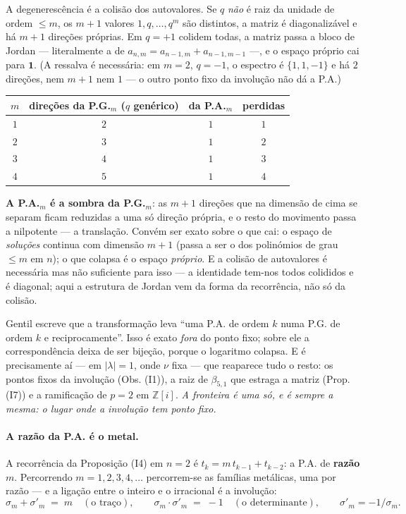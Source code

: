 \documentclass[11pt,a4paper]{article}
\theoremstyle{plain}
\theoremstyle{definition}
\theoremstyle{remark}
\newcommand{\Z}{\mathbb{Z}}
\begin{document}
\noindent A degenerescência é a colisão dos autovalores. Se $q$ \emph{não} é raiz da unidade de
ordem $\leq m$, os $m+1$ valores $1,q,\dots,q^m$ são distintos, a matriz é diagonalizável e há
$m+1$ direções próprias. Em $q=+1$ colidem todas, a matriz passa a bloco de Jordan --- literalmente
a de $a_{n,m}=a_{n-1,m}+a_{n-1,m-1}$ ---, e o espaço próprio cai para $\mathbf 1$. (A ressalva é
necessária: em $m=2$, $q=-1$, o espectro é $\{1,1,-1\}$ e há $2$ direções, nem $m+1$ nem $1$ --- o
outro ponto fixo da involução não dá a P.A.)

\begin{center}\small
\begin{tabular}{cccc}
\hline
$m$ & direções da P.G.$_m$ ($q$ genérico) & da P.A.$_m$ & perdidas \\ \hline
$1$ & $2$ & $1$ & $1$ \\
$2$ & $3$ & $1$ & $2$ \\
$3$ & $4$ & $1$ & $3$ \\
$4$ & $5$ & $1$ & $4$ \\
\hline
\end{tabular}
\end{center}

\noindent \textbf{A P.A.$_m$ é a sombra da P.G.$_m$}: as $m+1$ direções que na dimensão de cima se
separam ficam reduzidas a uma só direção própria, e o resto do movimento passa a nilpotente --- a
translação. Convém ser exato sobre o que cai: o espaço de \emph{soluções} continua com dimensão
$m+1$ (passa a ser o dos polinómios de grau $\leq m$ em $n$); o que colapsa é o espaço
\emph{próprio}. E a colisão de autovalores é necessária mas não suficiente para isso --- a
identidade tem-nos todos colididos e é diagonal; aqui a estrutura de Jordan vem da forma da
recorrência, não só da colisão.

Gentil escreve que a transformação leva ``uma P.A. de ordem $k$ numa P.G. de ordem $k$ e
reciprocamente''. Isso é exato \emph{fora} do ponto fixo; sobre ele a correspondência deixa de ser
bijeção, porque o logaritmo colapsa. E é precisamente aí --- em $|\lambda|=1$, onde $\nu$ fixa ---
que reaparece tudo o resto: os pontos fixos da involução (Obs. (I1)), a raiz de
$\beta_{5,1}$ que estraga a matriz (Prop. (I7)) e a ramificação de $p=2$ em $\Z[i]$.
\emph{A fronteira é uma só, e é sempre a mesma: o lugar onde a involução tem ponto fixo.}


\paragraph{A razão da P.A. é o metal.} A recorrência da Proposição (I4) em $n=2$ é
$t_k = m\,t_{k-1} + t_{k-2}$: a P.A. de \textbf{razão $m$}. Percorrendo $m = 1,2,3,4,\dots$
percorrem-se as famílias metálicas, uma por razão --- e a ligação entre o inteiro e o irracional é
a involução:
\[
  \sigma_m + \sigma'_m \;=\; m \quad(\text{o traço}), \qquad
  \sigma_m \cdot \sigma'_m \;=\; -1 \quad(\text{o determinante}),
  \qquad \sigma'_m = -1/\sigma_m .
\]
\end{document}

